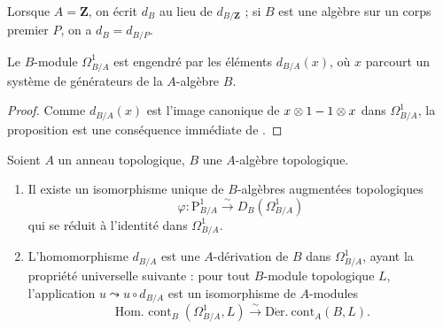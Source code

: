 Lorsque $A=\mathbf{Z}$, on écrit $d_B$ au lieu de $d_{B/\mathbf{Z}}$ ; si $B$
est une algèbre sur un corps premier $P$, on a $d_B=d_{B/P}$.

\begin{proposition}[20.4.7]
\label{0.20.4.7-fr}
Le $B$-module $\Omega^1_{B/A}$ est engendré par les éléments $d_{B/A}(x)$,
où $x$ parcourt un système de générateurs de la $A$-algèbre $B$.
\end{proposition}

\begin{proof}
Comme $d_{B/A}(x)$ est l'image canonique de $x\otimes1- 1\otimes x$ dans
$\Omega^1_{B/A}$, la proposition est une conséquence immédiate de
.
\end{proof}

\begin{theorem}[20.4.8]
\label{0.20.4.8-fr}
Soient $A$ un anneau topologique, $B$ une $A$-algèbre topologique.
\begin{enumerate}
  \item[\rm(i)] Il existe un isomorphisme unique de $B$-algèbres augmentées
  topologiques
\begin{equation}
\tag{20.4.8.1}
\label{0.20.4.8.1-fr}
  \varphi:\mathrm{P}^1_{B/A}\xrightarrow{\sim}D_B(\Omega^1_{B/A})
\end{equation}
qui se réduit à l'identité dans $\Omega^1_{B/A}$.
  \item[\rm(ii)] L'homomorphisme $d_{B/A}$ est une $A$-dérivation de $B$
  dans $\Omega^1_{B/A}$, ayant la propriété universelle suivante : pour tout
  $B$-module topologique $L$, l'application $u\leadsto u\circ d_{B/A}$ est
  un isomorphisme de $A$-modules
\begin{equation}
\tag{20.4.8.2}
\label{0.20.4.8.2-fr}
  \operatorname{Hom.\ cont}_B(\Omega^1_{B/A},L)
  \xrightarrow{\sim}\operatorname{D\acute{e}r.\ cont}_A(B,L).
\end{equation}
\end{enumerate}
\end{theorem}

